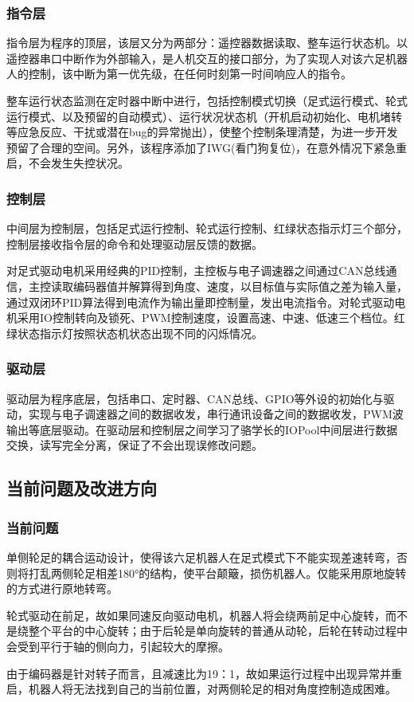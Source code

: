 \documentclass[12pt]{article}
\begin{document}
\begin{CJK}{UTF8}{gbsn}
\subsubsection{指令层}
指令层为程序的顶层，该层又分为两部分：遥控器数据读取、整车运行状态机。以遥控器串口中断作为外部输入，是人机交互的接口部分，为了实现人对该六足机器人的控制，该中断为第一优先级，在任何时刻第一时间响应人的指令。\par
整车运行状态监测在定时器中断中进行，包括控制模式切换（足式运行模式、轮式运行模式、以及预留的自动模式）、运行状况状态机（开机启动初始化、电机堵转等应急反应、干扰或潜在bug的异常抛出），使整个控制条理清楚，为进一步开发预留了合理的空间。另外，该程序添加了IWG(看门狗复位)，在意外情况下紧急重启，不会发生失控状况。
\subsubsection{控制层}
中间层为控制层，包括足式运行控制、轮式运行控制、红绿状态指示灯三个部分，控制层接收指令层的命令和处理驱动层反馈的数据。\par
对足式驱动电机采用经典的PID控制，主控板与电子调速器之间通过CAN总线通信，主控读取编码器值并解算得到角度、速度，以目标值与实际值之差为输入量，通过双闭环PID算法得到电流作为输出量即控制量，发出电流指令。对轮式驱动电机采用IO控制转向及锁死、PWM控制速度，设置高速、中速、低速三个档位。红绿状态指示灯按照状态机状态出现不同的闪烁情况。
\subsubsection{驱动层}
驱动层为程序底层，包括串口、定时器、CAN总线、GPIO等外设的初始化与驱动，实现与电子调速器之间的数据收发，串行通讯设备之间的数据收发，PWM波输出等底层驱动。在驱动层和控制层之间学习了骆学长的IOPool中间层进行数据交换，读写完全分离，保证了不会出现误修改问题。
\subsection{当前问题及改进方向}
\subsubsection{当前问题}
单侧轮足的耦合运动设计，使得该六足机器人在足式模式下不能实现差速转弯，否则将打乱两侧轮足相差180°的结构，使平台颠簸，损伤机器人。仅能采用原地旋转的方式进行原地转弯。\par
轮式驱动在前足，故如果同速反向驱动电机，机器人将会绕两前足中心旋转，而不是绕整个平台的中心旋转；由于后轮是单向旋转的普通从动轮，后轮在转动过程中会受到平行于轴的侧向力，引起较大的摩擦。\par
由于编码器是针对转子而言，且减速比为19：1，故如果运行过程中出现异常并重启，机器人将无法找到自己的当前位置，对两侧轮足的相对角度控制造成困难。

\end{CJK}
\end{document}
